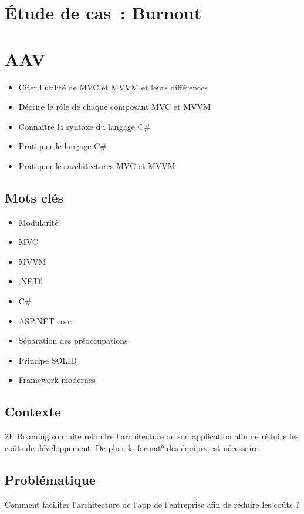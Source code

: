 \newpage
\section*{Étude de cas~: Burnout}

\section*{AAV}
\begin{itemize}
	\item [1] Citer l'utilité de MVC et MVVM et leurs différences
	\item [1] Décrire le rôle de chaque composant MVC et MVVM
	\item [1] Connaître la syntaxe du langage C\#
	\item [3] Pratiquer le langage C\#
	\item [3] Pratiquer les architectures MVC et MVVM
\end{itemize}

\newpage

\subsection*{Mots clés}
{}
\begin{itemize}
	\item Modularité
	\item MVC
	\item MVVM
	\item .NET6
	\item C\#
	\item ASP.NET core
	\item Séparation des préoccupations
	\item Principe SOLID
	\item Framework modernes
\end{itemize}

\subsection*{Contexte}
{}
\noindent 2F Roaming souhaite refondre l’architecture de son application afin de réduire les coûts de développement. De plus, la format° des équipes est nécessaire.

\subsection*{Problématique}
{}
\noindent Comment faciliter l’architecture de l’app de l’entreprise afin de réduire les coûts ?

